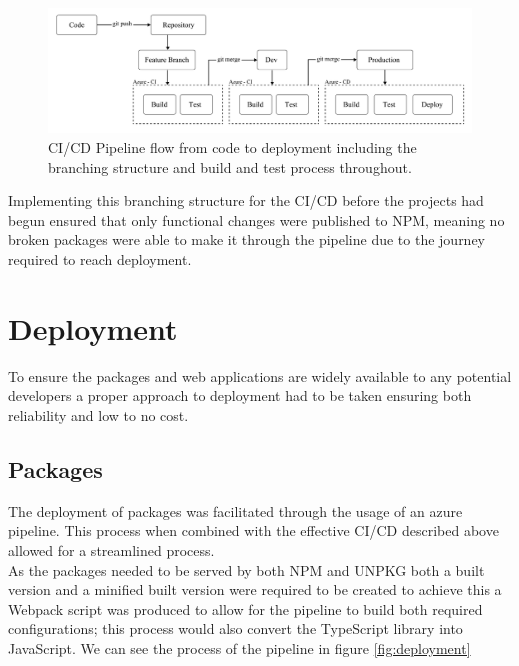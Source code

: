 \documentclass{l4proj}
\begin{document}
\begin{figure}[!ht]
    \begin{center}
        
    
    \includegraphics[width=14cm]{dissertation/images/CICD-structure.png}
    \end{center}
    \caption{CI/CD Pipeline flow from code to deployment including the branching structure and build and test process throughout.}
    \label{fig:CICDPipeline}
\end{figure}

Implementing this branching structure for the CI/CD before the projects had begun ensured that only functional changes were published to NPM, meaning no broken packages were able to make it through the pipeline due to the journey required to reach deployment.

\section{Deployment}
To ensure the packages and web applications are widely available to any potential developers a proper approach to deployment had to be taken ensuring both reliability and low to no cost.

\subsection{Packages}
The deployment of packages was facilitated through the usage of an azure pipeline. This process when combined with the effective CI/CD described above allowed for a streamlined process.
\\ 
As the packages needed to be served by both NPM and UNPKG both a built version and a minified built version were required to be created to achieve this a Webpack script was produced to allow for the pipeline to build both required configurations; this process would also convert the TypeScript library into JavaScript. We can see the process of the pipeline in figure \ref{fig:deployment}
\end{document}
